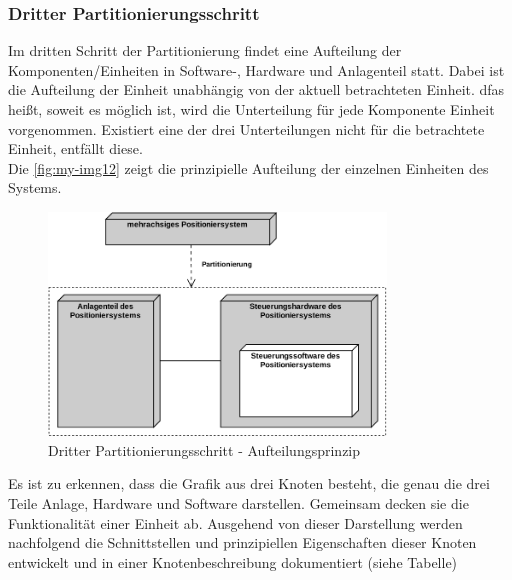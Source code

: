 \documentclass[../Bachelorarbeit.tex]{subfiles}
\begin{document}
\subsubsection{Dritter Partitionierungsschritt}
Im dritten Schritt der Partitionierung findet eine Aufteilung der Komponenten/Einheiten in Software-, Hardware und Anlagenteil statt. Dabei ist die Aufteilung der Einheit unabhängig von der aktuell betrachteten Einheit. dfas heißt, soweit es möglich ist, wird die Unterteilung für jede Komponente \bzw Einheit vorgenommen. Existiert eine der drei Unterteilungen nicht für die betrachtete Einheit, entfällt diese.\\
Die \autoref{fig:my-img12} zeigt die prinzipielle Aufteilung der einzelnen Einheiten des Systems.

\begin{figure}[H]
    \centering
    \includegraphics[width=0.8\textwidth]{Images/dritter_schritt.pdf}
    \caption[Dritter Partitionierungsschritt]{Dritter Partitionierungsschritt - Aufteilungsprinzip}
    \label{fig:my-img12}
\end{figure}

Es ist zu erkennen, dass die Grafik aus drei Knoten besteht, die genau die drei Teile Anlage, Hardware und Software darstellen. Gemeinsam decken sie die Funktionalität einer Einheit ab. Ausgehend von dieser Darstellung werden nachfolgend die Schnittstellen und prinzipiellen Eigenschaften dieser Knoten entwickelt und in einer Knotenbeschreibung dokumentiert (siehe Tabelle) \\ %
\end{document}
